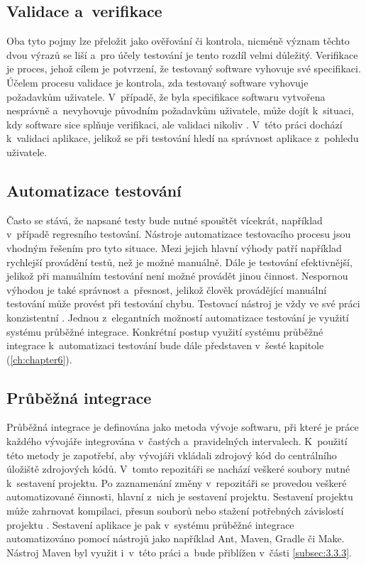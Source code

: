 \documentclass[
    color,   %
	table,   %
    twoside, %
    nolot, nolof,
]{fithesis3}
\begin{document}
\subsection{Validace a~verifikace}
Oba tyto pojmy lze přeložit jako ověřování či kontrola, nicméně význam těchto dvou výrazů se liší a~pro účely testování je tento rozdíl velmi důležitý. Verifikace je proces, jehož cílem je potvrzení, že testovaný software vyhovuje své specifikaci. Účelem procesu validace je kontrola, zda testovaný software vyhovuje požadavkům uživatele. V~případě, že byla specifikace softwaru vytvořena nesprávně a~nevyhovuje původním požadavkům uživatele, může dojít k~situaci, kdy software sice splňuje verifikaci, ale validaci nikoliv \cite{Patton}. V~této práci dochází k~validaci aplikace, jelikož se při testování hledí na správnost aplikace z~pohledu uživatele.

\subsection{Automatizace testování}
Často se stává, že napsané testy bude nutné spouštět vícekrát, například v~případě regresního testování. Nástroje automatizace testovacího procesu jsou vhodným řešením pro tyto situace. Mezi jejich hlavní výhody patří například rychlejší provádění testů, než je možné manuálně. Dále je testování efektivnější, jelikož při manuálním testování není možné provádět jinou činnost. Nespornou výhodou je také správnost a~přesnost, jelikož člověk provádějící manuální testování může provést při testování chybu. Testovací nástroj je vždy ve své práci konzistentní \cite{Patton}. Jednou z~elegantních možností automatizace testování je využití systému průběžné integrace. Konkrétní postup využití systému průběžné integrace k~automatizaci testování bude dále představen v~šesté kapitole (\ref{ch:chapter6}).

\subsection{Průběžná integrace}
Průběžná integrace je definována jako metoda vývoje softwaru, při které je práce každého vývojáře integrována v~častých a~pravidelných intervalech. K~použití této metody je zapotřebí, aby vývojáři vkládali zdrojový kód do centrálního úložiště zdrojových kódů. V~tomto repozitáři se nachází veškeré soubory nutné k~sestavení projektu. Po zaznamenání změny v~repozitáři se provedou veškeré automatizované činnosti, hlavní z~nich je sestavení projektu. Sestavení projektu může zahrnovat kompilaci, přesun souborů nebo stažení potřebných závislostí projektu \cite{Fowler}. Sestavení aplikace je pak v~systému průběžné integrace automatizováno pomocí nástrojů jako například Ant, Maven, Gradle či Make. Nástroj Maven byl využit i~v~této práci a~bude přiblížen v~části \ref{subsec:3.3.3}.
\end{document}
